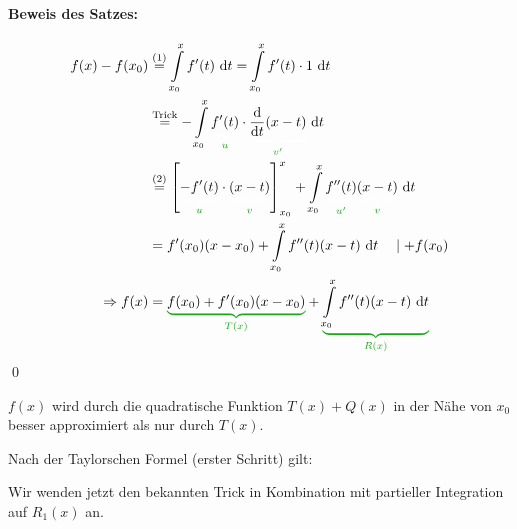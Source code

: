 \paragraph{Beweis des Satzes:}
\begin{align*}
f(x)-f(x_0)&\stackrel{(1)}{=}\int\limits_{x_0}^{x} f'(t)\intd{t}=\int\limits_{x_0}^{x}f'(t)\cdot1\intd{t}\\
&\stackrel{\text{Trick}}{=}-\int\limits_{x_0}^{x}\greenunder{f'(t)}{u}\cdot \greenunder{\df{}{t}(x-t)}{v'}\intd{t}\\
&\stackrel{(2)}{=}\left[\greenunder{-f'(t)}{u}\cdot\greenunder{(x-t)}{v}\right]_{x_0}^x+\int\limits_{x_0}^{x}\greenunder{f''(t)}{u'}\greenunder{(x-t)}{v}\intd{t}\\
&=f'(x_0)(x-x_0)+\int\limits_{x_0}^{x}f''(t)(x-t)\intd{t}\quad\mid+f(x_0)\\
\Rightarrow f(x)&=\greenunderbrace{f(x_0)+f'(x_0)(x-x_0)}{T(x)}+\greenunderbrace{\int\limits_{x_0}^{x}f''(t)(x-t)\intd{t}}{R(x)}
\end{align*}
\qed


\Bem $f(x)$ wird durch die quadratische Funktion $T(x)+Q(x)$ in der Nähe von $x_0$ besser approximiert als nur durch $T(x)$.

\Beweis Nach der Taylorschen Formel (erster Schritt) gilt:

Wir wenden jetzt den bekannten Trick in Kombination mit partieller Integration auf $R_1(x)$ an.

